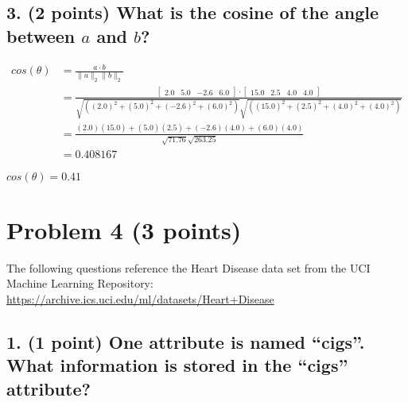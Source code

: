 \documentclass[11pt]{article}
\begin{document}
\newpage
\subsection*{\textbf{3. (2 points)} What is the cosine of the angle between $a$ and $b$?}

\begin{align*}
    cos(\theta) &= \frac{ a \cdot b }{ \| a \|_2 \| b \|_2 }  \\
    &= \frac{ 
            \begin{bmatrix} 2.0  & 5.0 & -2.6 & 6.0 \end{bmatrix} \cdot \begin{bmatrix} 15.0 & 2.5 &  4.0 & 4.0 \end{bmatrix}
        }{
            \sqrt{ ((2.0)^2 + (5.0)^2 + (-2.6)^2 + (6.0)^2) } \sqrt{ ((15.0)^2 + (2.5)^2 + (4.0)^2 + (4.0)^2) }
        } \\
    &=  \frac{ 
            (2.0)(15.0) + (5.0)(2.5) + (-2.6)(4.0) + (6.0)(4.0)
        }{
            \sqrt{ 71.76 } \sqrt{ 263.25 }
        } \\
    &= 0.408167
\end{align*}

\begin{tcolorbox}[title=Problem 3.2]
    $cos(\theta) = 0.41$
\end{tcolorbox}

\newpage
\section*{Problem 4 (3 points)}

The following questions reference the Heart Disease data set from the UCI
Machine Learning Repository: \url{https://archive.ics.uci.edu/ml/datasets/Heart+Disease}

\subsection*{\textbf{1. (1 point)} One attribute is named ``cigs''.  What information is stored in the ``cigs'' attribute?}
\end{document}
